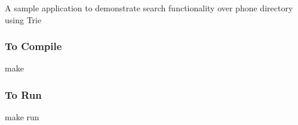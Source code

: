 A sample application to demonstrate search functionality over phone directory using Trie

\subsubsection*{To Compile}

{\ttfamily make}

\subsubsection*{To Run}

{\ttfamily make run} 